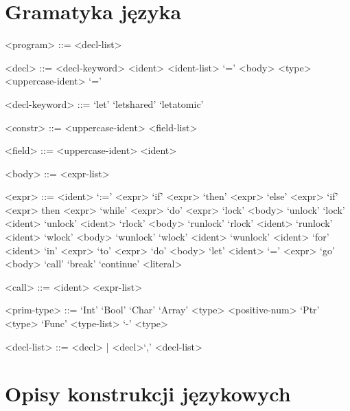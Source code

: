 \documentclass{documentation}
\begin{document}
\section{Gramatyka języka}
\begin{grammar}

<program> ::= <decl-list>



<decl> ::= <decl-keyword> <ident> <ident-list> `=' <body>
\alt <type> <uppercase-ident> `=' 

<decl-keyword> ::= `let'
\alt `letshared'
\alt `letatomic'

<constr> ::= <uppercase-ident> <field-list>

<field> ::= <uppercase-ident> <ident>

<body> ::= <expr-list>

<expr> ::= <ident> `:=' <expr>
\alt `if' <expr> `then' <expr> `else' <expr>
\alt `if' <expr> then <expr>
\alt `while' <expr> `do' <expr>
\alt `lock' <body> `unlock'
\alt `lock' <ident>
\alt `unlock' <ident>
\alt `rlock' <body> `runlock'
\alt `rlock' <ident>
\alt `runlock' <ident>
\alt `wlock' <body> `wunlock'
\alt `wlock' <ident>
\alt `wunlock' <ident>
\alt `for' <ident> `in' <expr> `to' <expr> `do' <body>
\alt `let' <ident> `=' <expr>
\alt `go' <body>
\alt `call'
\alt `break'
\alt `continue'
\alt <literal>

<call> ::= <ident> <expr-list>

<prim-type> ::= `Int'
\alt `Bool'
\alt `Char'
\alt `Array' <type> <positive-num>
\alt `Ptr' <type>
\alt `Func' <type-list> `-\>' <type>

<decl-list> ::= <decl> | <decl>`,' <decl-list>

\end{grammar}


\section{Opisy konstrukcji językowych}
\end{document}
